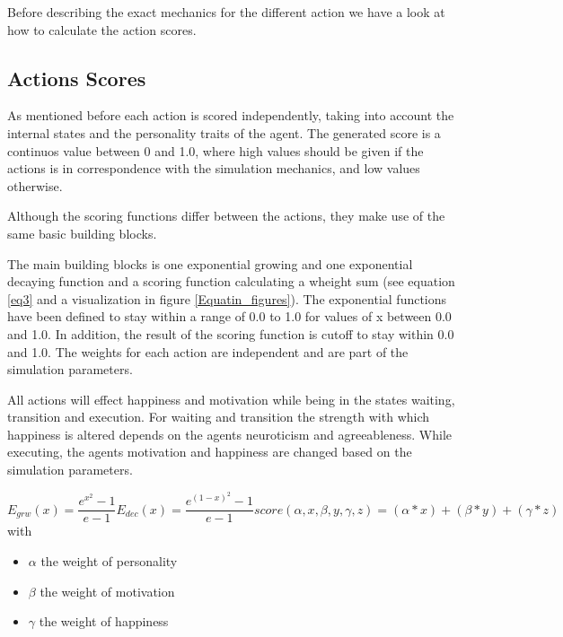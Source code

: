 Before describing the exact mechanics for the different action we have a look at
how to calculate the action scores.

\label{action-scores}
\subsection{Actions Scores}
As mentioned before each action is scored independently, taking into account the
internal states and the personality traits of the agent. The generated score is
a continuos value between 0 and 1.0, where high values should be given if the
actions is in correspondence with the simulation mechanics, and low values otherwise.

Although the scoring functions differ between the actions, they make use of the
same basic building blocks.

The main building blocks is one exponential growing and one exponential decaying
function and a scoring function calculating a wheight sum (see equation \ref{eq3}
and a visualization in figure \ref{Equatin_figures}). The exponential functions
have been defined to stay within a range of 0.0 to 1.0 for values of x between 0.0
and 1.0. In addition, the result of the scoring function is cutoff to stay within
0.0 and 1.0. The weights for each action are independent and are part
of the simulation parameters.

All actions will effect happiness and motivation while being in the states waiting,
transition and execution. For waiting and transition the strength with which
happiness is altered depends on the agents neuroticism and agreeableness.
While executing, the agents motivation and happiness are changed based on the
simulation parameters.

\begin{subequations} 
\label{eq3}
\begin{equation}
    E_{grw}(x) =  \frac{e^{x^2}-1}{e - 1}
\end{equation}
\begin{equation}
    E_{dec}(x) =  \frac{e^{(1 - x)^2}-1}{e - 1}
\end{equation}
\begin{equation}
    score(\alpha,x,\beta,y,\gamma,z) = (\alpha * x) + (\beta * y) + (\gamma * z)
\end{equation}
\end{subequations}
with
\begin{itemize}
    \item $\alpha$ the weight of personality
    \item $\beta$ the weight of motivation
    \item $\gamma$ the weight of happiness
\end{itemize}

